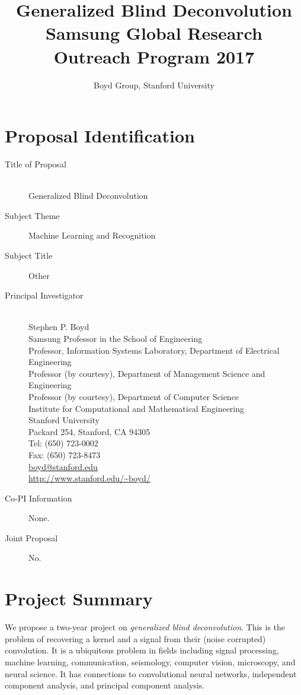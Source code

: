 \documentclass[12pt]{article}
\title{\large \bf Generalized Blind Deconvolution\\
\small Samsung Global Research Outreach Program 2017}
\author{Boyd Group, Stanford University}
\date{}
\begin{document}
\maketitle

\section{Proposal Identification}
\begin{description}
\item[Title of Proposal]\hfill\\ Generalized Blind Deconvolution
\item[Subject Theme] Machine Learning and Recognition
\item[Subject Title] Other
\item[Principal Investigator] \hfill\\
Stephen P. Boyd\\
Samsung Professor in the School of Engineering\\
Professor, Information Systems Laboratory, Department of Electrical Engineering\\
Professor (by courtesy), Department of Management Science and Engineering\\
Professor (by courtesy), Department of Computer Science\\
Institute for Computational and Mathematical Engineering\\
Stanford University\\
Packard 254, Stanford, CA 94305\\
Tel: (650) 723-0002\\
Fax: (650) 723-8473\\
\url{boyd@stanford.edu}\\
\url{http://www.stanford.edu/~boyd/}\\
\item[Co-PI Information] None.
\item[Joint Proposal] No.
\end{description}

\newpage
\section{Project Summary}

We propose a two-year project on \emph{generalized blind deconvolution}.
This is the problem of recovering a kernel and a signal from 
their (noise corrupted) convolution.
It is a ubiquitous problem in fields including signal processing, 
machine learning, communication, seismology, computer vision, 
microscopy, and neural science. 
It has connections to convolutional neural networks,
independent component analysis, and principal component analysis.
\end{document}
